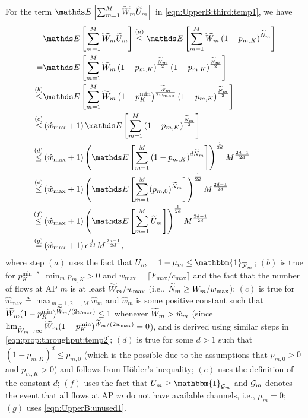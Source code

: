 \documentclass[10pt, conference, letterpaper]{IEEEtran} %
\begin{document}
For the term $\bE\left[\sum_{m=1}^{M}\wt{W}_m\wt{U}_m\right]$ in \eqref{eqn:UpperB:third:temp1}, we have
\begin{align}
\label{eqn:UpperB:third:tempIm}
&\bE\left[\sum_{m=1}^{M}\wt{W}_m\wt{U}_m\right]
\stackrel{(a)}{\leq}\bE\left[\sum_{m=1}^{M}\wt{W}_m\left(1-p_{m,K}\right)^{\wt{N}_{m}}\right]\nonumber\\
=&\bE\left[\sum_{m=1}^{M}\wt{W}_m\left(1-p_{m,K}\right)^{\frac{\wt{N}_{m}}{2}}\left(1-p_{m,K}\right)^{\frac{\wt{N}_{m}}{2}}\right] \nonumber\\
\stackrel{(b)}{\leq}&\bE\left[\sum_{m=1}^{M}\wt{W}_m\left(1-p_K^{\min}\right)^{\frac{\wt{W}_m}{2w_{max}}}\left(1-p_{m,K}\right)^{\frac{\wt{N}_{m}}{2}}\right] \nonumber\\
\stackrel{(c)}{\leq}&\left(\hat{w}_{\max}+1\right)\bE\left[\sum_{m=1}^{M}\left(1-p_{m,K}\right)^{\frac{\wt{N}_{m}}{2}}\right]\nonumber\\
\stackrel{(d)}{\leq}&\left(\hat{w}_{\max}+1\right)\left(\bE\left[\sum_{m=1}^{M}\left(1-p_{m,K}\right)^{d\wt{N}_{m}}\right]\right)^{\frac{1}{2d}}M^{\frac{2d-1}{2d}}\nonumber\\
\stackrel{(e)}{\leq}&\left(\hat{w}_{\max}+1\right)\left(\bE\left[\sum_{m=1}^{M}(p_{m,0})^{\wt{N}_{m}}\right]\right)^{\frac{1}{2d}}M^{\frac{2d-1}{2d}}\nonumber\\
\stackrel{(f)}{\leq}&\left(\hat{w}_{\max}+1\right)\left(\bE\left[\sum_{m=1}^{M}\wt{U}_m\right]\right)^{\frac{1}{2d}}M^{\frac{2d-1}{2d}}\nonumber\\
\stackrel{(g)}{=}&\left(\hat{w}_{\max}+1\right)\epsilon^{\frac{1}{2d}}M^{\frac{2d-1}{2d}},
\end{align}
where step $(a)$ uses the fact that $U_m=1-\mu_m\leq\mathbbm{1}_{\ol{\mc{F}}_m}$; $(b)$ is true for $p_K^{\min}\triangleq\min_{m}p_{m,K}>0$ and $w_{\max}=\lceil F_{\max}/c_{\max}\rceil$ and the fact that the number of flows at AP $m$ is at least $\widetilde{W}_m/w_{\max}$ (i.e., $\widetilde{N}_{m}\geq W_m/w_{\max}$); $(c)$ is true for $\hat{w}_{\max}\triangleq\max_{m=1,2,\ldots,M}\hat{w}_{m}$ and $\hat{w}_m$ is some positive constant such that $\widetilde{W}_m(1-p_K^{\min})^{\widetilde{W}_m/(2w_{\max})}\leq1$ whenever $\widetilde{W}_m>\hat{w}_m$ (since $\lim_{\widetilde{W}_m\rightarrow\infty}\widetilde{W}_m(1-p_K^{\min})^{\widetilde{W}_m/(2w_{\max})}=0$), and is derived using similar steps in \eqref{eqn:prop:throughput:temp2}; $(d)$ is true for some $d>1$ such that $(1-p_{m,K})^d\leq p_{m,0}$ (which is the possible due to the assumptions that $p_{m,0}>0$ and $p_{m,K}>0$) and follows from H\"{o}lder's inequality; $(e)$ uses the definition of the constant $d$; $(f)$ uses the fact that $U_m\geq\mathbbm{1}_{\mc{G}_m}$ and $\mathcal{G}_m$ denotes the event that all flows at AP $m$ do not have available channels, i.e., $\mu_m=0$; $(g)$ uses \eqref{eqn:UpperB:unused1}.
 
\end{document}
